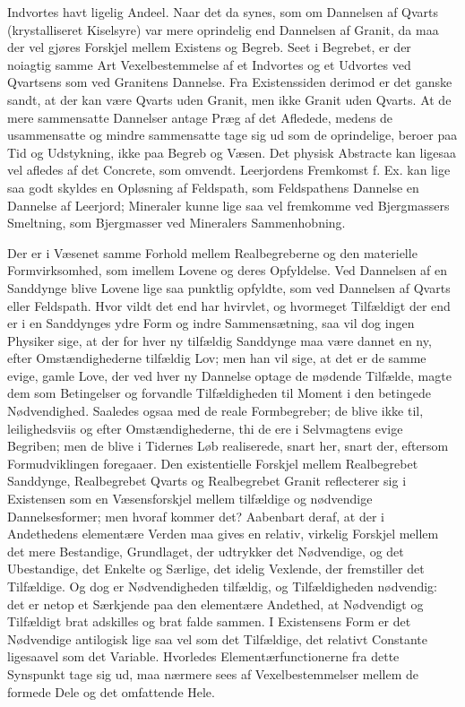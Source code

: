 \documentclass[12pt,a4paper]{book}
\begin{document}
Indvortes havt ligelig Andeel. Naar det da synes, som om Dannelsen af
Qvarts (krystalliseret Kiselsyre) var mere oprindelig end Dannelsen af
Granit, da maa der vel gjøres Forskjel mellem Existens og Begreb. Seet i
Begrebet, er der noiagtig samme Art Vexelbestemmelse af et Indvortes og
et Udvortes ved Qvartsens som ved Granitens Dannelse. Fra Existenssiden
derimod er det ganske sandt, at der kan være Qvarts uden Granit, men
ikke Granit uden Qvarts. At de mere sammensatte Dannelser antage Præg af
det Afledede, medens de usammensatte og mindre sammensatte tage sig ud
som de oprindelige, beroer paa Tid og Udstykning, ikke paa Begreb og
Væsen. Det physisk Abstracte kan ligesaa vel afledes af det Concrete,
som omvendt. Leerjordens Fremkomst f. Ex. kan lige saa godt skyldes en
Opløsning af Feldspath, som Feldspathens Dannelse en Dannelse af
Leerjord; Mineraler kunne lige saa vel fremkomme ved Bjergmassers
Smeltning, som Bjergmasser ved Mineralers Sammenhobning.

Der er i Væsenet samme Forhold mellem Realbegreberne og den materielle
Formvirksomhed, som imellem Lovene og deres Opfyldelse. Ved Dannelsen af
en Sanddynge blive Lovene lige saa punktlig opfyldte, som ved Dannelsen
af Qvarts eller Feldspath. Hvor vildt det end har hvirvlet, og hvormeget
Tilfældigt der end er i en Sanddynges ydre Form og indre Sammensætning,
saa vil dog ingen Physiker
sige, at der for hver ny tilfældig Sanddynge maa være dannet en ny,
efter Omstændighederne tilfældig Lov; men han vil sige, at det er de
samme evige, gamle Love, der ved hver ny Dannelse optage de mødende
Tilfælde, magte dem som Betingelser og forvandle Tilfældigheden til
Moment i den betingede Nødvendighed. Saaledes ogsaa med de reale
Formbegreber; de blive ikke til, leilighedsviis og efter
Omstændighederne, thi de ere i Selvmagtens evige Begriben; men de blive
i Tidernes Løb realiserede, snart her, snart der, eftersom
Formudviklingen foregaaer. Den existentielle Forskjel mellem
Realbegrebet Sanddynge, Realbegrebet Qvarts og Realbegrebet Granit
reflecterer sig i Existensen som en Væsensforskjel mellem tilfældige og
nødvendige Dannelsesformer; men hvoraf kommer det? Aabenbart deraf, at
der i Andethedens elementære Verden maa gives en relativ, virkelig
Forskjel mellem det mere Bestandige, Grundlaget, der udtrykker det
Nødvendige, og det Ubestandige, det Enkelte og Særlige, det idelig
Vexlende, der fremstiller det Tilfældige. Og dog er Nødvendigheden
tilfældig, og Tilfældigheden nødvendig: det er netop et Særkjende paa
den elementære Andethed, at Nødvendigt og Tilfældigt brat adskilles og
brat falde sammen. I Existensens Form er det Nødvendige antilogisk lige
saa vel som det Tilfældige, det relativt Constante ligesaavel som det
Variable. Hvorledes Elementærfunctionerne fra dette Synspunkt tage sig
ud, maa nærmere sees af Vexelbestemmelser mellem de formede Dele og det
omfattende Hele.
\end{document}
